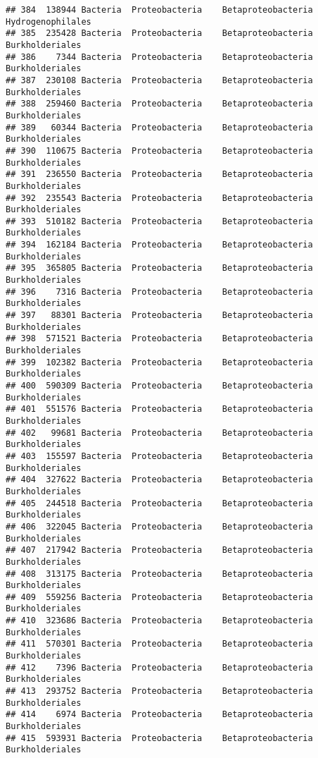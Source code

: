 \documentclass[
]{article}
\begin{document}
\begin{verbatim}
## 384  138944 Bacteria  Proteobacteria    Betaproteobacteria   Hydrogenophilales
## 385  235428 Bacteria  Proteobacteria    Betaproteobacteria     Burkholderiales
## 386    7344 Bacteria  Proteobacteria    Betaproteobacteria     Burkholderiales
## 387  230108 Bacteria  Proteobacteria    Betaproteobacteria     Burkholderiales
## 388  259460 Bacteria  Proteobacteria    Betaproteobacteria     Burkholderiales
## 389   60344 Bacteria  Proteobacteria    Betaproteobacteria     Burkholderiales
## 390  110675 Bacteria  Proteobacteria    Betaproteobacteria     Burkholderiales
## 391  236550 Bacteria  Proteobacteria    Betaproteobacteria     Burkholderiales
## 392  235543 Bacteria  Proteobacteria    Betaproteobacteria     Burkholderiales
## 393  510182 Bacteria  Proteobacteria    Betaproteobacteria     Burkholderiales
## 394  162184 Bacteria  Proteobacteria    Betaproteobacteria     Burkholderiales
## 395  365805 Bacteria  Proteobacteria    Betaproteobacteria     Burkholderiales
## 396    7316 Bacteria  Proteobacteria    Betaproteobacteria     Burkholderiales
## 397   88301 Bacteria  Proteobacteria    Betaproteobacteria     Burkholderiales
## 398  571521 Bacteria  Proteobacteria    Betaproteobacteria     Burkholderiales
## 399  102382 Bacteria  Proteobacteria    Betaproteobacteria     Burkholderiales
## 400  590309 Bacteria  Proteobacteria    Betaproteobacteria     Burkholderiales
## 401  551576 Bacteria  Proteobacteria    Betaproteobacteria     Burkholderiales
## 402   99681 Bacteria  Proteobacteria    Betaproteobacteria     Burkholderiales
## 403  155597 Bacteria  Proteobacteria    Betaproteobacteria     Burkholderiales
## 404  327622 Bacteria  Proteobacteria    Betaproteobacteria     Burkholderiales
## 405  244518 Bacteria  Proteobacteria    Betaproteobacteria     Burkholderiales
## 406  322045 Bacteria  Proteobacteria    Betaproteobacteria     Burkholderiales
## 407  217942 Bacteria  Proteobacteria    Betaproteobacteria     Burkholderiales
## 408  313175 Bacteria  Proteobacteria    Betaproteobacteria     Burkholderiales
## 409  559256 Bacteria  Proteobacteria    Betaproteobacteria     Burkholderiales
## 410  323686 Bacteria  Proteobacteria    Betaproteobacteria     Burkholderiales
## 411  570301 Bacteria  Proteobacteria    Betaproteobacteria     Burkholderiales
## 412    7396 Bacteria  Proteobacteria    Betaproteobacteria     Burkholderiales
## 413  293752 Bacteria  Proteobacteria    Betaproteobacteria     Burkholderiales
## 414    6974 Bacteria  Proteobacteria    Betaproteobacteria     Burkholderiales
## 415  593931 Bacteria  Proteobacteria    Betaproteobacteria     Burkholderiales

\end{verbatim}
\end{document}
